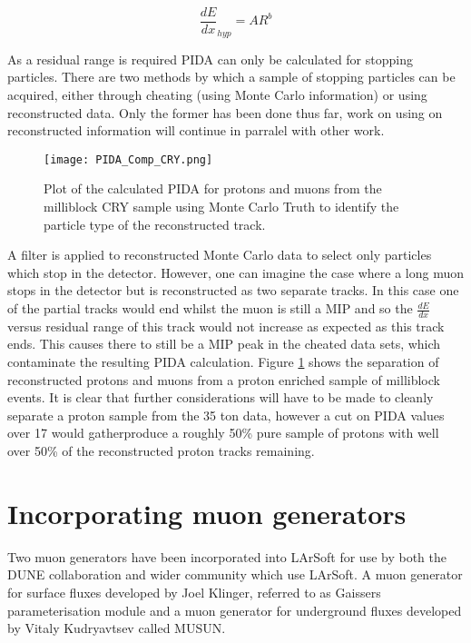 \documentclass[11pt]{report} %
\begin{document}
{\begin{equation}
  \label{eq:PIDA_eq}
  \frac{dE}{dx}_{hyp} = A R^b 
\end{equation}

As a residual range is required PIDA can only be calculated for stopping particles. There are two methods by which a sample of stopping particles can be acquired, either through cheating (using Monte Carlo information) or using reconstructed data. Only the former has been done thus far, work on using on reconstructed information will continue in parralel with other work. \\

\begin{figure}[h]
  \centering
  \texttt{[image: PIDA\_Comp\_CRY.png]}
  \caption{Plot of the calculated PIDA for protons and muons from the milliblock CRY sample using Monte Carlo Truth to identify the particle type of the reconstructed track.}
  \label{fig:PIDA_Comp}
\end{figure}

A filter is applied to reconstructed Monte Carlo data to select only particles which stop in the detector. However, one can imagine the case where a long muon stops in the detector but is reconstructed as two separate tracks. In this case one of the partial tracks would end whilst the muon is still a MIP and so the $\frac{dE}{dx}$ versus residual range of this track would not increase as expected as this track ends. This causes there to still be a MIP peak in the cheated data sets, which contaminate the resulting PIDA calculation. Figure \ref{fig:PIDA_Comp} shows the separation of reconstructed protons and muons from a proton enriched sample of milliblock events. It is clear that further considerations will have to be made to cleanly separate a proton sample from the 35 ton data, however a cut on PIDA values over 17 would gatherproduce a roughly 50\% pure sample of protons with well over 50\% of the reconstructed proton tracks remaining.\\

\section{Incorporating muon generators}
Two muon generators have been incorporated into LArSoft for use by both the DUNE collaboration and wider community which use LArSoft. A muon generator for surface fluxes developed by Joel Klinger, referred to as Gaissers parameterisation module and a muon generator for underground fluxes developed by Vitaly Kudryavtsev called MUSUN.\\

}
\end{document}
